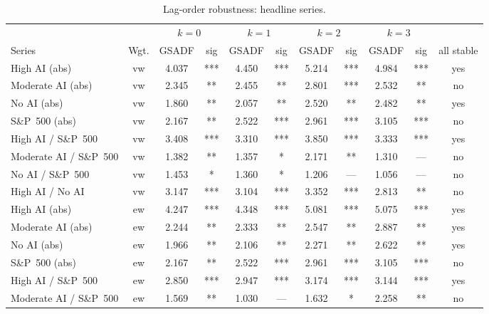 \begin{table}[t]
\centering
\caption{Lag-order robustness: headline series.}
\label{tab:rob-lags-headline}
\small
\begin{tabular}{l c S[table-format=1.3] c S[table-format=1.3] c S[table-format=1.3] c S[table-format=1.3] c c}
\toprule
 & &  &  &  &  & \\
\cmidrule(lr){3-4}\cmidrule(lr){5-6}\cmidrule(lr){7-8}\cmidrule(lr){9-10}
Series & Wgt. & {GSADF} & sig & {GSADF} & sig & {GSADF} & sig & {GSADF} & sig & all stable \\
\midrule
High AI (abs)              & vw & 4.037 & *** & 4.450 & *** & 5.214 & *** & 4.984 & *** & yes \\
Moderate AI (abs)          & vw & 2.345 & **  & 2.455 & **  & 2.801 & *** & 2.532 & **  & no  \\
No AI (abs)                & vw & 1.860 & **  & 2.057 & **  & 2.520 & **  & 2.482 & **  & yes \\
S\&P~500 (abs)             & vw & 2.167 & **  & 2.522 & *** & 2.961 & *** & 3.105 & *** & no  \\
High AI / S\&P~500         & vw & 3.408 & *** & 3.310 & *** & 3.850 & *** & 3.333 & *** & yes \\
Moderate AI / S\&P~500     & vw & 1.382 & **  & 1.357 & *   & 2.171 & **  & 1.310 & ---  & no  \\
No AI / S\&P~500           & vw & 1.453 & *   & 1.360 & *   & 1.206 & --- & 1.056 & --- & no  \\
High AI / No AI            & vw & 3.147 & *** & 3.104 & *** & 3.352 & *** & 2.813 & **  & no  \\
\midrule
High AI (abs)              & ew & 4.247 & *** & 4.348 & *** & 5.081 & *** & 5.075 & *** & yes \\
Moderate AI (abs)          & ew & 2.244 & **  & 2.333 & **  & 2.547 & **  & 2.887 & **  & yes \\
No AI (abs)                & ew & 1.966 & **  & 2.106 & **  & 2.271 & **  & 2.622 & **  & yes \\
S\&P~500 (abs)             & ew & 2.167 & **  & 2.522 & *** & 2.961 & *** & 3.105 & *** & no  \\
High AI / S\&P~500         & ew & 2.850 & *** & 2.947 & *** & 3.174 & *** & 3.144 & *** & yes \\
Moderate AI / S\&P~500     & ew & 1.569 & **  & 1.030 & --- & 1.632 & *   & 2.258 & **  & no  \\

\end{tabular}
\end{table}
